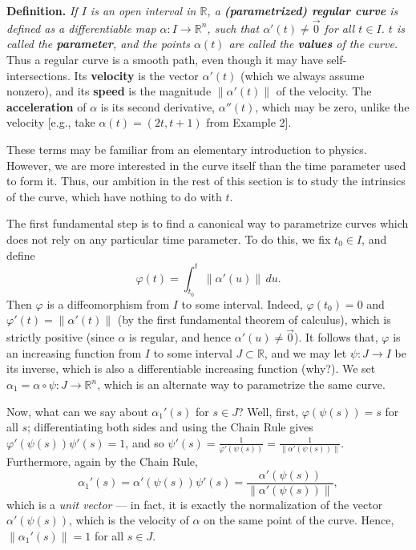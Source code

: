 \documentclass[leqno]{book}
\begin{document}
\noindent\textbf{Definition.} \emph{If $I$ is an open interval in $\mathbb R$, a \textbf{(parametrized) regular curve} is defined as a differentiable map $\alpha:I\to\mathbb R^n$, such that $\alpha'(t)\ne\vec 0$ for all $t\in I$.  $t$ is called the \textbf{parameter}, and the points $\alpha(t)$ are called the \textbf{values} of the curve.}\\

\noindent Thus a regular curve is a smooth path, even though it may have self-intersections.  Its \textbf{velocity} is the vector $\alpha'(t)$ (which we always assume nonzero), and its \textbf{speed} is the magnitude $\|\alpha'(t)\|$ of the velocity.  The \textbf{acceleration} of $\alpha$ is its second derivative, $\alpha''(t)$, which may be zero, unlike the velocity [e.g., take $\alpha(t)=(2t,t+1)$ from Example 2].

These terms may be familiar from an elementary introduction to physics.  However, we are more interested in the curve itself than the time parameter used to form it.  Thus, our ambition in the rest of this section is to study the intrinsics of the curve, which have nothing to do with $t$.

The first fundamental step is to find a canonical way to parametrize curves which does not rely on any particular time parameter.  To do this, we fix $t_0\in I$, and define
$$\varphi(t)=\int_{t_0}^t\|\alpha'(u)\|\,du.$$
Then $\varphi$ is a diffeomorphism from $I$ to some interval.  Indeed, $\varphi(t_0)=0$ and $\varphi'(t)=\|\alpha'(t)\|$ (by the first fundamental theorem of calculus), which is strictly positive (since $\alpha$ is regular, and hence $\alpha'(u)\ne\vec 0$).  It follows that, $\varphi$ is an increasing function from $I$ to some interval $J\subset\mathbb R$, and we may let $\psi:J\to I$ be its inverse, which is also a differentiable increasing function (why?).  We set $\alpha_1=\alpha\circ\psi:J\to\mathbb R^n$, which is an alternate way to parametrize the same curve.

Now, what can we say about $\alpha_1'(s)$ for $s\in J$?  Well, first, $\varphi(\psi(s))=s$ for all $s$; differentiating both sides and using the Chain Rule gives $\varphi'(\psi(s))\psi'(s)=1$, and so $\psi'(s)=\frac 1{\varphi'(\psi(s))}=\frac 1{\|\alpha'(\psi(s))\|}$.  Furthermore, again by the Chain Rule,
$$\alpha_1'(s)=\alpha'(\psi(s))\psi'(s)=\frac{\alpha'(\psi(s))}{\|\alpha'(\psi(s))\|},$$
which is a \emph{unit vector} \---- in fact, it is exactly the normalization of the vector $\alpha'(\psi(s))$, which is the velocity of $\alpha$ on the same point of the curve.  Hence, $\|\alpha_1'(s)\|=1$ for all $s\in J$.
\end{document}
